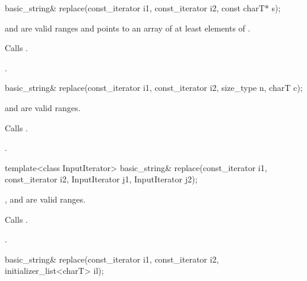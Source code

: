 %
%
\begin{itemdecl}
basic_string& replace(const_iterator i1, const_iterator i2, const charT* s);
\end{itemdecl}

\begin{itemdescr}
\pnum
\requires {} and  are valid ranges and
 points to an array of at least 
elements of .

\pnum
\effects Calls .

\pnum
\returns
{}.
\end{itemdescr}

%
%
\begin{itemdecl}
basic_string& replace(const_iterator i1, const_iterator i2, size_type n,
                      charT c);
\end{itemdecl}

\begin{itemdescr}
\pnum
\requires {} and  are valid ranges.

\pnum
\effects Calls .

\pnum
\returns
{}.
\end{itemdescr}

%
%
\begin{itemdecl}
template<class InputIterator>
  basic_string& replace(const_iterator i1, const_iterator i2,
                        InputIterator j1, InputIterator j2);
\end{itemdecl}

\begin{itemdescr}
\pnum
\requires {},  and  are valid ranges.

\pnum
\effects Calls .

\pnum
\returns
{}.
\end{itemdescr}

%
%
\begin{itemdecl}
basic_string& replace(const_iterator i1, const_iterator i2,
                      initializer_list<charT> il);
\end{itemdecl}

